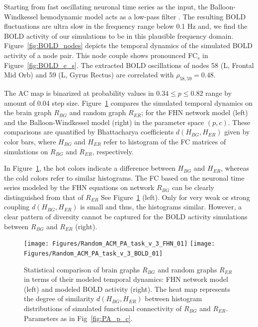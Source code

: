 \documentclass[fleqn,10pt]{wlpeerj}
\newcommand{\red}[1]{\textcolor{red}{(#1)}}
\begin{document}
Starting from fast oscillating neuronal time series as the input, the Balloon-Windkessel hemodynamic model acts as a
low-pass filter \citep{FRI00}. The resulting BOLD fluctuations are ultra slow in the frequency range below 0.1 Hz and,
we find the BOLD activity of our simulations to be in this plausible frequency domain. Figure~\ref{fig:BOLD_nodes}
depicts the temporal dynamics of the simulated BOLD activity of a node pair. This node couple shows pronounced FC$_s$ in
Figure~\ref{fig:BOLD_e_s}. The extracted BOLD oscillations of nodes 58 (L, Frontal Mid Orb) and 59 (L, Gyrus Rectus) are
correlated with $\rho_{58,59}=0.48$. 

The AC map is binarized at probability values in $0.34 \leq p \leq 0.82$ range by amount of 0.04 step size.
Figure~\ref{fig:BG_vs_RG_v_3} compares the simulated temporal dynamics on the brain graph $R_{BG}$ and random graph
$R_{ER}$; for the FHN network model (left) and the Balloon-Windkessel model (right) in the parameter space $(p,c)$.
These comparisons are quantified by Bhattacharya coefficients $d(H_{BG}, H_{ER})$ given by color bars, where $H_{BG}$
and
$H_{ER}$ refer to histogram of the FC matrices of simulations on $R_{BG}$ and $R_{ER}$, respectively. 

In Figure~\ref{fig:BG_vs_RG_v_3}, the hot colors indicate a difference between $H_{BG}$ and $H_{ER}$, whereas the cold
colors refer to similar histograms. The FC based on the neuronal time series modeled by the FHN equations on network
$R_{BG}$ can be clearly distinguished from that of $R_{ER}$
See Figure~\ref{fig:BG_vs_RG_v_3} (left). Only for very weak or strong coupling $d(H_{BG}, H_{ER})$ is small and thus, the
histograms similar. However, a clear pattern of diversity cannot be captured for the BOLD activity
simulations between $R_{BG}$ and $R_{ER}$ (right).  

\begin{figure}[ht] \centering
	 \texttt{[image: Figures/Random\_ACM\_PA\_task\_v\_3\_FHN\_01]} 
	 \texttt{[image: Figures/Random\_ACM\_PA\_task\_v\_3\_BOLD\_01]} 
   	 \caption{Statistical comparison of brain graphs $R_{BG}$ and random graphs $R_{ER}$ in terms of their
modeled temporal dynamics: FHN network model (left) and modeled BOLD activity (right). The heat map represents the
degree of similarity $d\left(H_{BG}, H_{ER}\right)$ between histogram distributions of simulated functional connectivity
of $R_{BG}$ and $R_{ER}$. Parameters as in Fig~\ref{fig:PA_p_c}.\\
} 
    \label{fig:BG_vs_RG_v_3}
\end{figure}
\end{document}
